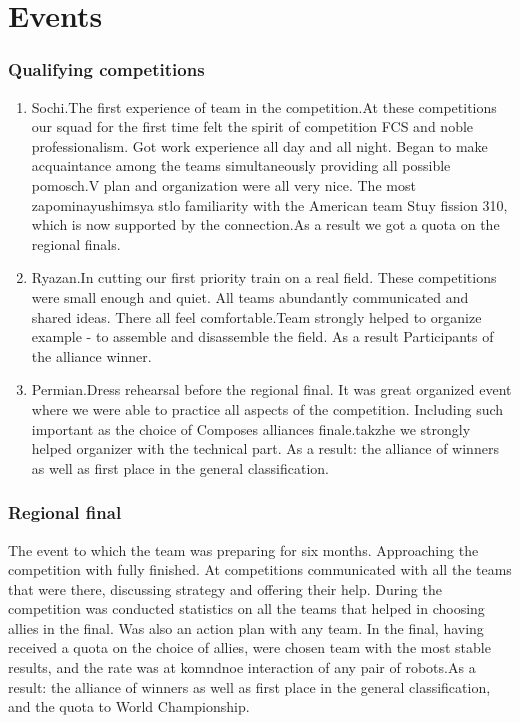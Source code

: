 \section{Events}
	\subsubsection{Qualifying competitions}
		\begin{enumerate}
			\item Sochi.The first experience of team in the competition.At these competitions our squad for the first time felt the spirit of competition FCS and noble professionalism. Got work experience all day and all night. Began to make acquaintance among the teams simultaneously providing all possible pomosch.V plan and organization were all very nice. The most zapominayushimsya stlo familiarity with the American team Stuy fission 310, which is now supported by the connection.As a result we got a quota on the regional finals.
			
			\item Ryazan.In cutting our first priority train on a real field. These competitions were small enough and quiet. All teams abundantly communicated and shared ideas. There all feel comfortable.Team strongly helped to organize example - to assemble and disassemble the field. As a result Participants of the alliance winner. 
			
			\item Permian.Dress rehearsal before the regional final. It was great organized event where we were able to practice all aspects of the competition. Including such important as the choice of Composes alliances finale.takzhe we strongly helped organizer with the technical part. As a result: the alliance of winners as well as first place in the general classification.
		\end{enumerate}  
	\subsubsection{Regional final}	
		The event to which the team was preparing for six months. Approaching the competition with fully finished. At competitions communicated with all the teams that were there, discussing strategy and offering their help. During the competition was conducted statistics on all the teams that helped in choosing allies in the final. Was also an action plan with any team. In the final, having received a quota on the choice of allies, were chosen team with the most stable results, and the rate was at komndnoe interaction of any pair of robots.As a result: the alliance of winners as well as first place in the general classification, and the quota to World Championship.
	\newpage			
